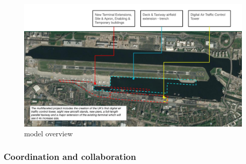\documentclass[
]{article}
\begin{document}
\begin{figure}[H]

{\centering \includegraphics{assets/PAW/2020-Portfolio-Google-Overview.jpg}

}

\caption{model overview}

\end{figure}%

\subsubsection{Coordination and
collaboration}\label{coordination-and-collaboration}
\end{document}
